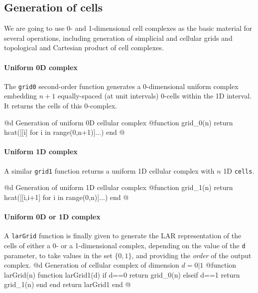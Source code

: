 \subsection{Generation of cells}

We are going to use 0- and 1-dimensional cell complexes as the basic material for several operations, including generation of simplicial and cellular grids and topological and Cartesian product of cell complexes. 


\paragraph{Uniform 0D complex}
The \texttt{grid0} second-order function generates a 0-dimensional uniform complex embedding $n+1$ equally-spaced (at unit intervals) 0-cells within the 1D interval. It returns the cells of this 0-complex.

@d Generation of uniform 0D cellular complex 
@{function grid_0(n)
    return hcat([[i] for i in range(0,n+1)]...)
end
@}

\paragraph{Uniform 1D complex}
A similar \texttt{grid1} function returns a uniform 1D cellular complex with $n$ 1D \texttt{cells}.

@d Generation of uniform 1D cellular complex 
@{function grid_1(n)
    return hcat([[i,i+1] for i in range(0,n)]...)
end
@}

\paragraph{Uniform 0D or 1D complex}
A \texttt{larGrid} function is finally given to generate the LAR representation of the cells of either a 0- or a 1-dimensional complex, depending on the value of the \texttt{d} parameter, to take values in the set $\{0,1\}$, and providing the \emph{order} of the output complex.
@d Generation of cellular complex of dimension $d = 0 | 1$
@{function larGrid(n)
    function larGrid1(d)
        if d==0 
        	return grid_0(n)
        elseif d==1 
        	return grid_1(n) 
        end
    end
    return larGrid1
end
@}



